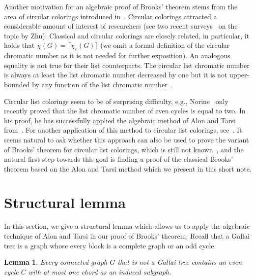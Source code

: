 \documentclass[10pt]{article}
\newtheorem{lemma}[theorem]{Lemma}
\begin{document}
Another motivation for an algebraic proof of Brooks' theorem
stems from the area of circular colorings introduced in~\cite{bib-vince88}.
Circular colorings attracted a considerable amount of interest of researchers (see
two recent surveys~\cite{bib-zhu01,bib-zhu06} on the topic by Zhu). Classical and circular colorings
are closely related, in particular, it holds that $\chi(G)=\lceil\chi_c(G)\rceil$ (we omit a formal
definition of the circular chromatic number as it is not needed for further exposition).
An analogous equality
is not true for their list counterparts. The circular list chromatic number is always at least the list
chromatic number decreased by one but it is not upper-bounded by any function of the list chromatic
number~\cite{bib-zhu05}.

Circular list colorings seem to be of surprising difficulty, e.g., Norine~\cite{bib-norine08} only recently
proved that the list chromatic number of even cycles is equal to two. In his proof, he has successfully
applied the algebraic method of Alon and Tarsi from~\cite{bib-alon92+}. For another application of this
method to circular list colorings, see~\cite{bib-norine08+,bib-norine08++}. It seems natural to ask whether this approach
can also be used to prove the variant of Brooks' theorem for circular list colorings, which is still
not known~\cite{bib-zhu05}, and the natural
first step towards this goal is finding a proof of the classical Brooks' theorem based on the Alon and Tarsi method
which we present in this short note.

\section{Structural lemma}

In this section, we give a structural lemma which allows us to apply the algebraic technique of Alon and Tarsi
in our proof of Brooks' theorem.
Recall that a Gallai tree is a graph whose every block is a complete graph or an odd cycle.

\begin{lemma}
\label{lm-struct}
Every connected graph $G$ that is not a Gallai tree contains an even cycle $C$ with at most one chord
as an induced subgraph.
\end{lemma}
\end{document}
